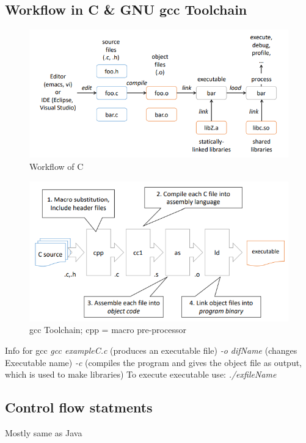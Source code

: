 \documentclass[a4paper,10pt]{article}
\begin{document}
\subsection{Workflow in C \& GNU gcc Toolchain}
\begin{figure}[htp]
    \centering
    \includegraphics[width=1\linewidth]{Pictures/e4.png}
    \caption{Workflow of C}
    \label{fig:enter-label}
\end{figure}
\begin{figure}[htp]
    \centering
    \includegraphics[width=1\linewidth]{Pictures/e5.png}
    \caption{gcc Toolchain; cpp = macro pre-processor}
    \label{fig:enter-label}
\end{figure}
\begin{tipbox}
    {Info for gcc}
    \textit{gcc exampleC.c} (produces an executable file)
    \textit{-o difName} (changes Executable name)
    \textit{-c } (compiles the program and gives the object file as output, which is used to make libraries)
    To execute executable use: \textit{./exfileName}
\end{tipbox}

\subsection{Control flow statments}
Mostly same as Java
\end{document}
